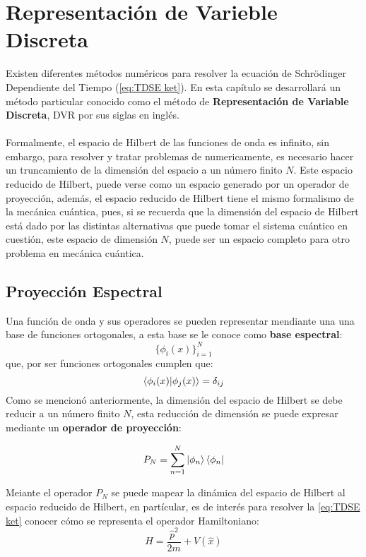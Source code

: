 \chapter{Representación de Varieble Discreta}\label{ch:DVR}
Existen diferentes métodos numéricos para resolver la ecuación de Schrödinger Dependiente del Tiempo (\autoref{eq:TDSE ket}). En esta capítulo se desarrollará un método particular conocido como el método de \textbf{Representación de Variable Discreta}, DVR por sus siglas en inglés.
\\\\
Formalmente, el espacio de Hilbert de las funciones de onda es infinito, sin embargo, para resolver y tratar problemas de numericamente, es necesario hacer un truncamiento de la dimensión del espacio a un número finito $N$. Este espacio reducido de Hilbert, puede verse como un espacio generado por un operador de proyección, además, el espacio reducido de Hilbert tiene el mismo formalismo de la mecánica cuántica, pues, si se recuerda que la dimensión del espacio de Hilbert está dado por las distintas alternativas que puede tomar el sistema cuántico en cuestión, este espacio de dimensión $N$, puede ser un espacio completo para otro problema en mecánica cuántica.

\section{Proyección Espectral}
Una función de onda y sus operadores se pueden representar mendiante una una base de funciones ortogonales, a esta base se le conoce como \textbf{base espectral}:
$$\{\phi_i(x)\}_{i=1}^{N}$$
que, por ser funciones ortogonales cumplen que:
$$\bra{\phi_i(x)}\ket{\phi_j(x)} = \delta_{ij}$$
Como se mencionó anteriormente, la dimensión del espacio de Hilbert se debe reducir a un número finito $N$, esta reducción de dimensión se puede expresar mediante un \textbf{operador de proyección}:

\begin{equation}
  \label{eq:operadorproyeccion}
  P_N = \sum_{n=1}^N\ket{\phi_n}\bra{\phi_n}
\end{equation}

Meiante el operador $P_N$ se puede mapear la dinámica del espacio de Hilbert al espacio reducido de Hilbert, en partícular, es de interés para resolver la \autoref{eq:TDSE ket} conocer cómo se representa el operador Hamiltoniano:
\begin{equation}
  \label{eq:Hamiltoniano}
  H = \frac{\hat{p}^2}{2m}+V(\hat{x})
\end{equation}

